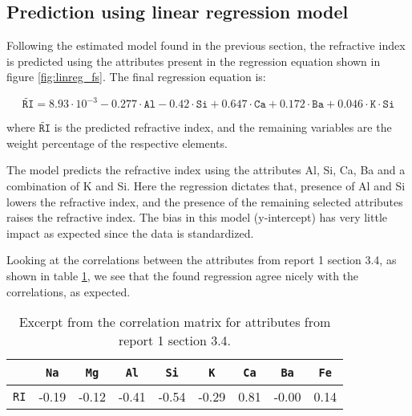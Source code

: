 \subsection{Prediction using linear regression model}

Following the estimated model found in the previous section, the refractive index is predicted using the attributes present in the regression equation shown in figure \ref{fig:linreg_fs}. The final regression equation is:

\begin{equation*}
    \widetilde{\texttt{RI}} = 8.93\cdot 10^{-3} - 0.277 \cdot \texttt{Al} - 0.42 \cdot \texttt{Si} + 0.647 \cdot \texttt{Ca} + 0.172 \cdot \texttt{Ba} + 0.046 \cdot \texttt{K}\cdot\texttt{Si}
\end{equation*}

where $\widetilde{\texttt{RI}}$ is the predicted refractive index, and the remaining variables are the weight percentage of the respective elements.

The model predicts the refractive index using the attributes Al, Si, Ca, Ba and a combination of K and Si. Here the regression dictates that, presence of Al and Si lowers the refractive index, and the presence of the remaining selected attributes raises the refractive index. The bias in this model (y-intercept) has very little impact as expected since the data is standardized.

Looking at the correlations between the attributes from report 1 section 3.4, as shown in table \ref{tab:attcorr}, we see that the found regression agree nicely with the correlations, as expected.

\begin{table}[H]
    \centering
    \begin{tabular}{c|| c c c c c c c c}
        ~ & \texttt{Na} & \texttt{Mg} & \texttt{Al} & \texttt{Si} & \texttt{K} & \texttt{Ca} & \texttt{Ba} & \texttt{Fe} \\ \hline \hline
        \texttt{RI} & -0.19 & -0.12 & -0.41 & -0.54 & -0.29 & 0.81 & -0.00 & 0.14
    \end{tabular}
    \caption{Excerpt from the correlation matrix for attributes from report 1 section 3.4.}
    \label{tab:attcorr}
\end{table} 